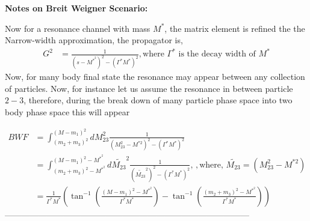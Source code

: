 \documentclass[12pt]{article}
\begin{document}
{{\textbf{Notes on Breit Weigner Scenario:}

  Now for a resonance channel with mass $M^*$, the matrix element is refined the the Narrow-width approximation, the propagator is,
  \begin{align}
      G^2 &= \frac{1}{(s - M^{*^2})^2 - (\Gamma^* M^*)^2}, \text{where } \Gamma^* \text{ is the decay width of $M^*$}
  \end{align}
  Now, for many body final state the resonance may appear between any collection of particles. Now, for instance let us assume the resonance in between particle $2-3$, therefore, during the break down of many particle phase space into two body phase space this will appear

  \begin{align}
     BWF &=  \int_{(m_2 + m_3)^2}^{(M-m_1)^2}{dM_{23}^2 \frac{1}{(M_{23}^2 - M^{*{2}})^2 - (\Gamma^* M^*)^2}} \, \\
     &=  \int_{(m_2 + m_3)^2 - M^{*^2}}^{(M-m_1)^2 - M^{*^2}}{d \tilde{M_{23}}^2 \frac{1}{(\tilde{M_{23}}^2)^2 - (\Gamma^* M^*)^2}} , \,, \text{where, } \tilde{M_{23}} = (M_{23}^2 - M^{*{2}}) \\
     &= \frac{1}{\Gamma^* M^*} \left( \tan^{-1}\left(\frac{(M-m_1)^2 - M^{*^2}}{\Gamma^* M^*}\right) - \tan^{-1}\left( \frac{(m_2 + m_3)^2 - M^{*^2}}{\Gamma^* M^*} \right)\right)
  \end{align}
 ---------------------------------------------------------------------------------------

}}
\end{document}
